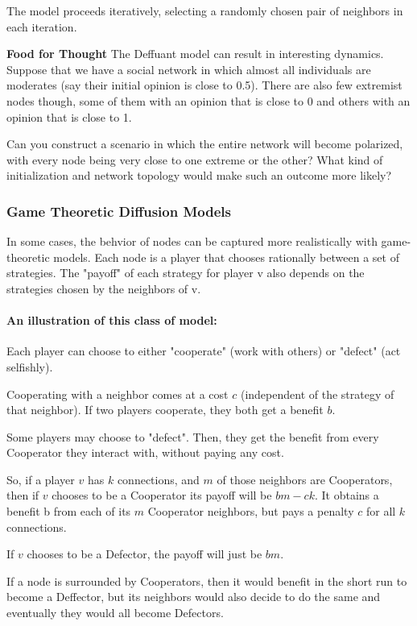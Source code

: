 \documentclass[11pt]{scrartcl} %
\begin{document}
The model proceeds iteratively, selecting a randomly chosen pair of neighbors in each iteration. 

\textbf{Food for Thought} 
The Deffuant model can result in interesting dynamics. Suppose that we have a social network in which almost all individuals are moderates (say their initial opinion is close to 0.5). There are also few extremist nodes though, some of them with an opinion that is close to 0 and others with an opinion that is close to 1.

Can you construct a scenario in which the entire network will become polarized, with every node being very close to one extreme or the other? What kind of initialization and network topology would make such an outcome more likely?

\subsubsection{Game Theoretic Diffusion Models}
In some cases, the behvior of nodes can be captured more realistically with game-theoretic models. Each node is a player that chooses rationally between a set of strategies. The "payoff" of each strategy for player v also depends on the strategies chosen by the neighbors of v.

\paragraph{An illustration of this class of model:}
Each player can choose to either "cooperate" (work with others) or "defect" (act selfishly).

Cooperating with a neighbor comes at a cost $c$ (independent of the strategy of that neighbor). If two players cooperate, they both get a benefit $b$.

Some players may choose to "defect". Then, they get the benefit from every Cooperator they interact with, without paying any cost.

So, if a player $v$ has $k$ connections, and $m$ of those neighbors are Cooperators, then if $v$ chooses to be a Cooperator its payoff will be $bm-ck$. It obtains a benefit b from each of its $m$ Cooperator neighbors, but pays a penalty $c$ for all $k$ connections. 

If $v$ chooses to be a Defector, the payoff will just be $bm$.

If a node is surrounded by Cooperators, then it would benefit in the short run to become a Deffector, but its neighbors would also decide to do the same and eventually they would all become Defectors. 
\end{document}
